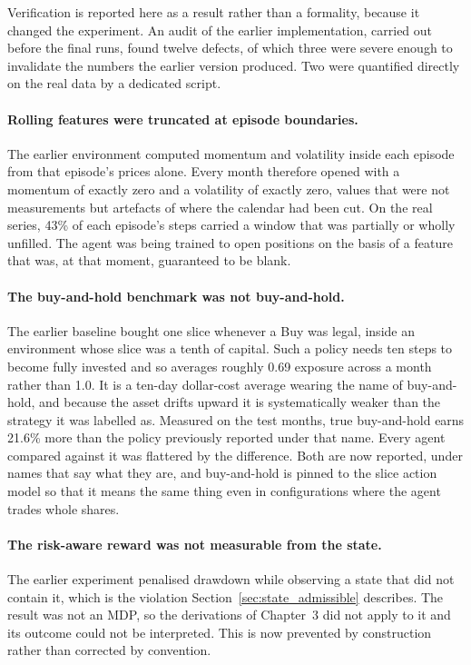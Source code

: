 Verification is reported here as a result rather than a formality, because
it changed the experiment. An audit of the earlier implementation, carried
out before the final runs, found twelve defects, of which three were severe
enough to invalidate the numbers the earlier version produced. Two were
quantified directly on the real data by a dedicated script.

\paragraph{Rolling features were truncated at episode boundaries.} The
earlier environment computed momentum and volatility inside each episode
from that episode's prices alone. Every month therefore opened with a
momentum of exactly zero and a volatility of exactly zero, values that were
not measurements but artefacts of where the calendar had been cut. On the
real series, 43\% of each episode's steps carried a window that was
partially or wholly unfilled. The agent was being trained to open positions
on the basis of a feature that was, at that moment, guaranteed to be blank.

\paragraph{The buy-and-hold benchmark was not buy-and-hold.} The earlier
baseline bought one slice whenever a Buy was legal, inside an environment
whose slice was a tenth of capital. Such a policy needs ten steps to become
fully invested and so averages roughly 0.69 exposure across a month rather
than 1.0. It is a ten-day dollar-cost average wearing the name of
buy-and-hold, and because the asset drifts upward it is systematically
weaker than the strategy it was labelled as. Measured on the test months,
true buy-and-hold earns 21.6\% more than the policy previously reported
under that name. Every agent compared against it was flattered by the
difference. Both are now reported, under names that say what they are, and
buy-and-hold is pinned to the slice action model so that it means the same
thing even in configurations where the agent trades whole shares.

\paragraph{The risk-aware reward was not measurable from the state.} The
earlier experiment penalised drawdown while observing a state that did not
contain it, which is the violation Section~\ref{sec:state_admissible}
describes. The result was not an MDP, so the derivations of Chapter~3 did
not apply to it and its outcome could not be interpreted. This is now
prevented by construction rather than corrected by convention.

